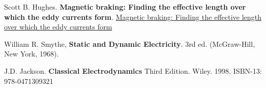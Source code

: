 \documentclass[10pt]{amsart}
\begin{document}
\begin{thebibliography}{9}


Scott B. Hughes.  \textbf{Magnetic braking: Finding the effective length over which the eddy currents form}.  
\href{https://drive.google.com/file/d/0Bwo3W0v5P04LX29XT2NFeVY0a1E/view}{Magnetic braking: Finding the effective length over which the eddy currents form}  


William R. Smythe, \textbf{Static and Dynamic Electricity}.  3rd ed. (McGraw-Hill, New York, 1968).  

J.D. Jackson.  \textbf{Classical Electrodynamics} Third Edition.  Wiley.  1998.   ISBN-13: 978-0471309321


\end{thebibliography}
\end{document}
